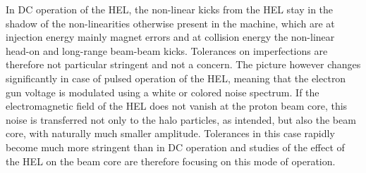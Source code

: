 \documentclass[%
 reprint,
 amsmath,amssymb,
 aps,
prstab,
]{revtex4-1}
\begin{document}
In DC operation of the HEL, the non-linear kicks from the HEL stay in the shadow of the non-linearities otherwise present in the machine, which are at injection energy mainly magnet errors and at collision energy the non-linear head-on and long-range beam-beam kicks. Tolerances on imperfections are therefore not particular stringent and not a concern. The picture however changes significantly in case of pulsed operation of the HEL, meaning that the electron gun voltage is modulated using a white or colored noise spectrum. If the electromagnetic field of the HEL does not vanish at the proton beam core, this noise is transferred not only to the halo particles, as intended, but also the beam core, with naturally much smaller amplitude. Tolerances in this case rapidly become much more stringent than in DC operation and studies of the effect of the HEL on the beam core are therefore focusing on this mode of operation.
\end{document}
